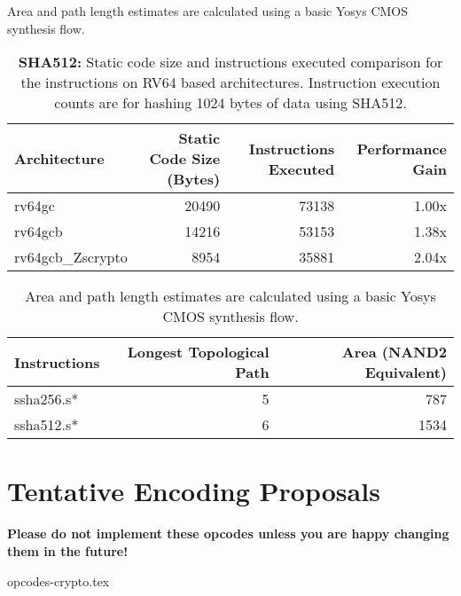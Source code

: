 Area and path length estimates are calculated using a basic Yosys CMOS
synthesis flow.

\begin{table}[h]
\centering
\begin{tabular}{lrrr}
Architecture      & Static Code Size (Bytes) & Instructions Executed & Performance Gain \\ \hline
rv64gc            & 20490                    & 73138 & 1.00x          \\
rv64gcb           & 14216                    & 53153 & 1.38x          \\
rv64gcb\_Zscrypto & 8954                     & 35881 & 2.04x 
\end{tabular}
\caption{{\bf SHA512:}
Static code size and instructions executed comparison for
the  instructions on RV64 based architectures.
Instruction execution counts are for hashing 1024 bytes of data
using SHA512.
}
\label{tab:benchmarks:sha512}
\end{table}

\begin{table}[h]
\centering
\begin{tabular}{lrr}
Instructions   & Longest Topological Path & Area (NAND2 Equivalent) \\ \hline
ssha256.s*     & 5                        & 787                   \\
ssha512.s*     & 6                        & 1534                  \\
\end{tabular}
\caption{
Area and path length estimates are calculated using a basic Yosys CMOS
synthesis flow.
}
\label{tab:benchmarks:sha2:rtl}
\end{table}


\newpage
\section{Tentative Encoding Proposals}

{\bf Please do not implement these opcodes unless you are happy changing
them in the future!}
\medskip

{opcodes-crypto.tex}


